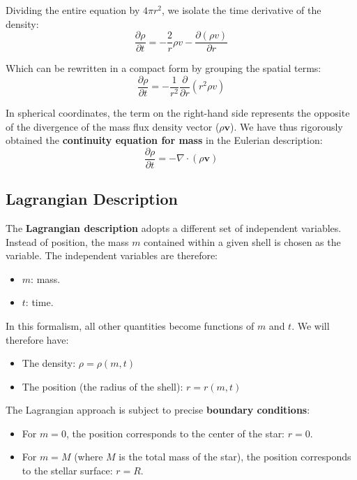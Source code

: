 Dividing the entire equation by $4\pi r^2$, we isolate the time derivative of the density:
\begin{equation}
\frac{\partial \rho}{\partial t} = -\frac{2}{r} \rho v - \frac{\partial (\rho v)}{\partial r}
\end{equation}

Which can be rewritten in a compact form by grouping the spatial terms:
\begin{equation}
\frac{\partial \rho}{\partial t} = -\frac{1}{r^2} \frac{\partial}{\partial r} (r^2 \rho v)
\end{equation}

In spherical coordinates, the term on the right-hand side represents the opposite of the divergence of the mass flux density vector ($\rho \mathbf{v}$). We have thus rigorously obtained the \textbf{continuity equation for mass} in the Eulerian description:
\begin{equation}
\frac{\partial \rho}{\partial t} = -\nabla \cdot (\rho \mathbf{v})
\end{equation}

\subsection{Lagrangian Description}

The \textbf{Lagrangian description} adopts a different set of independent variables. Instead of position, the mass $m$ contained within a given shell is chosen as the variable.
The independent variables are therefore:
\begin{itemize}
\item $m$: mass.
\item $t$: time.
\end{itemize}

In this formalism, all other quantities become functions of $m$ and $t$. We will therefore have:
\begin{itemize}
\item The density: $\rho = \rho(m,t)$
\item The position (the radius of the shell): $r = r(m,t)$
\end{itemize}

The Lagrangian approach is subject to precise \textbf{boundary conditions}:
\begin{itemize}
\item For $m = 0$, the position corresponds to the center of the star: $r = 0$.
\item For $m = M$ (where $M$ is the total mass of the star), the position corresponds to the stellar surface: $r = R$.
\end{itemize}

